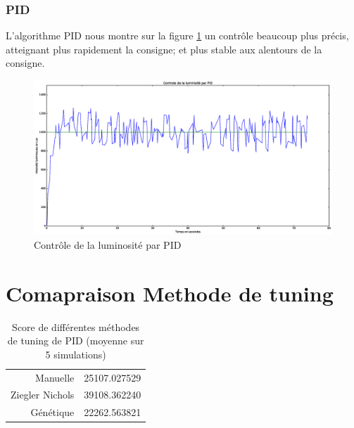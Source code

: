 \documentclass[a4paper,10pt]{report}
\begin{document}
\subsubsection{PID}
L'algorithme PID nous montre sur la figure \ref{fig:pid} un contrôle beaucoup plus précis, atteignant plus rapidement la consigne; et plus stable aux alentours de la consigne.
\begin{figure}[hb!]
   \centering
   \includegraphics[scale=0.35]{PID.eps}
   \caption{\label{fig:pid} Contrôle de la luminosité par PID}
\end{figure}


\section{Comapraison Methode de tuning}
\begin{table}[h]
    \begin{center}
        \begin{tabular}{r l}
            Manuelle & 25107.027529\\
            Ziegler Nichols & 39108.362240\\
            Génétique & 22262.563821
        \end{tabular}
    \end{center}
    \caption{Score de différentes méthodes de tuning de PID (moyenne sur 5 simulations)}
\end{table}
\end{document}
